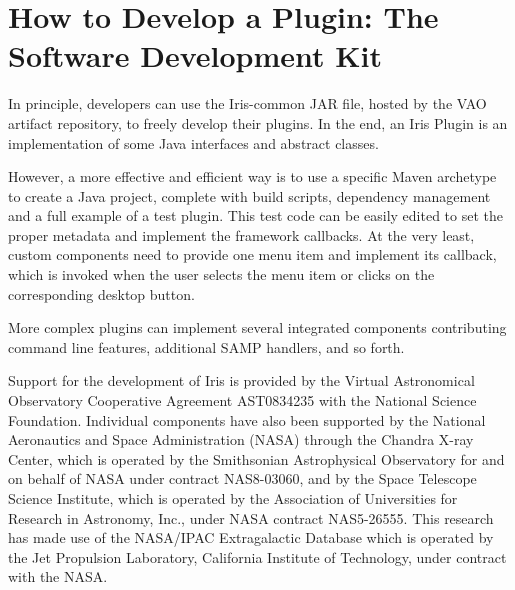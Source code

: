 \documentclass[11pt,twoside]{article}
\begin{document}
\section{How to Develop a Plugin: The Software Development Kit}
In principle, developers can use the Iris-common JAR file, hosted by the VAO artifact repository, to freely develop their plugins. In the end, an Iris Plugin is an implementation of some Java interfaces and abstract classes.

However, a more effective and efficient way is to use a specific Maven archetype to create a Java project, complete with build scripts, dependency management and a full example of a test plugin. This test code can be easily edited to set the proper metadata and implement the framework callbacks. At the very least, custom components need to provide one menu item and implement its callback, which is invoked when the user selects the menu item or clicks on the corresponding desktop button.

More complex plugins can implement several integrated components contributing command line features, additional SAMP handlers, and so forth.

\acknowledgements
Support for the development of Iris is provided by the Virtual Astronomical Observatory Cooperative Agreement AST0834235 with the National Science Foundation. Individual components have also been supported by the National Aeronautics and Space Administration (NASA) through the Chandra X-ray Center, which is operated by the Smithsonian Astrophysical Observatory for and on behalf of NASA under contract NAS8-03060,  and by the Space Telescope Science Institute, which is operated by the Association of Universities for Research in Astronomy, Inc., under NASA contract NAS5-26555. This research has made use of the NASA/IPAC Extragalactic Database which is operated by the Jet Propulsion Laboratory, California Institute of Technology, under contract with the NASA.



\end{document}
